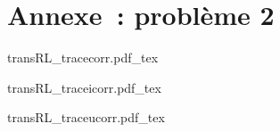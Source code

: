 \documentclass[a4paper, 10pt, garamond, oneside]{book}
\begin{document}
{	\chapter{Annexe~: problème 2}
	\begin{center}
		{transRL_tracecorr.pdf_tex}
		\label{fig:annexe_p2-1_corr}
	\end{center}
	\begin{center}
		{transRL_traceicorr.pdf_tex}
		\label{fig:annexe_p2-2_corr}
	\end{center}
	\begin{center}
		{transRL_traceucorr.pdf_tex}
		\label{fig:annexe_p2-3_corr}
	\end{center}
}
\vspace{-20pt}
\end{document}
